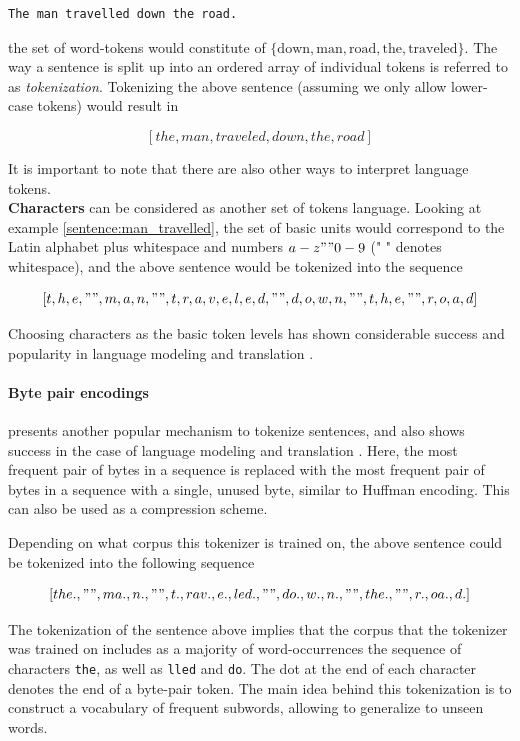 \documentclass[a4paper,12pt,oneside,openright]{report}
\begin{document}
\begin{tcolorbox}
\begin{verbatim}
The man travelled down the road.
\end{verbatim}
\label{sentence:man_travelled}
\end{tcolorbox}

the set of word-tokens would constitute of $\{ \text{down}, \text{man}, \text{road}, \text{the}, \text{traveled} \}$.
The way a sentence is split up into an ordered array of individual tokens is referred to as \textit{tokenization}.
Tokenizing the above sentence (assuming we only allow lower-case tokens) would result in 

$$
[the, man, traveled, down, the, road]
$$

It is important to note that there are also other ways to interpret language tokens. \\

\textbf{Characters} can be considered as another set of tokens language.
Looking at example \ref{sentence:man_travelled}, the set of basic units would correspond to the Latin alphabet plus whitespace and numbers $a - z" "0-9$ (" " denotes whitespace), and the above sentence would be tokenized into the sequence 

$$
[t, h, e, " ", m, a, n, " ", t, r, a, v, e, l, e, d, " ", d, o, w, n, " ", t, h, e, " ", r, o, a, d]
$$

Choosing characters as the basic token levels has shown considerable success and popularity in language modeling \cite{sutskever11} and translation \cite{lee17}.

\paragraph{Byte pair encodings} \cite{gage94} presents another popular mechanism to tokenize sentences, and also shows success in the case of language modeling and translation \cite{sennrich16}. 
Here, the most frequent pair of bytes in a sequence is replaced with the most frequent pair of bytes in a sequence with a single, unused byte, similar to Huffman encoding.
This can also be used as a compression scheme.

Depending on what corpus this tokenizer is trained on, the above sentence could be tokenized into the following sequence

$$
[the., " ", ma., n., " ", t., rav., e., led., " ", do., w., n., " ", the., " ", r., oa., d.]
$$

The tokenization of the sentence above implies that the corpus that the tokenizer was trained on includes as a majority of word-occurrences the sequence of characters \texttt{the}, as well as \texttt{lled} and \texttt{do}. 
The dot at the end of each character denotes the end of a byte-pair token.
The main idea behind this tokenization is to construct a vocabulary of frequent subwords, allowing to generalize to unseen words.
\end{document}
